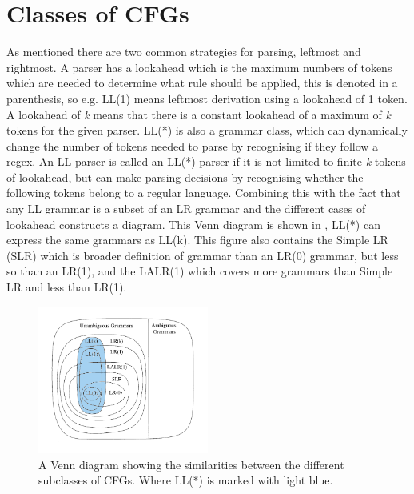 \section{Classes of CFGs}
As mentioned there are two common strategies for parsing, leftmost and rightmost. 
A parser has a lookahead which is the maximum numbers of tokens which are needed to determine what rule should be applied, this is denoted in a parenthesis, so e.g. LL(1) means leftmost derivation using a lookahead of 1 token.
A lookahead of \emph{k} means that there is a constant lookahead of a maximum of \emph{k} tokens for the given parser. 
LL(*) is also a grammar class, which can dynamically change the number of tokens needed to parse by recognising if they follow a \acrlong{regex}.
An LL parser is called an LL(*) parser if it is not limited to finite \emph{k} tokens of lookahead, but can make parsing decisions by recognising whether the following tokens belong to a regular language.
Combining this with the fact that any LL grammar is a subset of an LR grammar and the different cases of lookahead constructs a diagram. 
This Venn diagram is shown in , LL(*) can express the same grammars as LL(k).
This figure also contains the Simple LR (SLR) which is broader definition of grammar than an LR(0) grammar, but less so than an LR(1), and the LALR(1) which covers more grammars than Simple LR and less than LR(1). 
\begin{figure}[!ht]
\centering
 \includegraphics[width=0.5\textwidth]{figures/classesofgrammars.png} %
\caption[A Venn diagram showing the similarities between the different subclasses of CFGs]{A Venn diagram showing the similarities between the different subclasses of CFGs. Where LL(*) is marked with light blue. \citep{Lecture5}}
\label{fig:hierarchyofgrammars}
\vspace{-15pt}
\end{figure}
